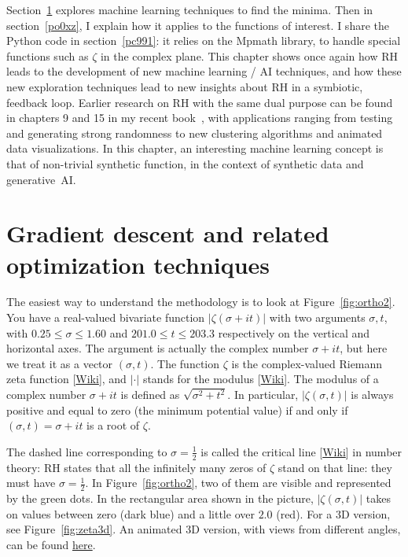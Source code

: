 \documentclass[oneside,10pt]{book}
\begin{document}
Section~\ref{hg21} explores machine learning techniques to find the minima. Then in section~\ref{po0xz}, I explain how it applies to the functions of interest. I share the Python code in section~\ref{pc991}: it relies on the Mpmath library, to handle special functions such as $\zeta$ in the complex plane. This chapter shows once again how RH leads to the development of new machine learning / AI techniques, and how these 
 new exploration techniques lead to new insights about RH in a symbiotic, feedback loop. Earlier research on RH with the same dual purpose can be found in chapters 9 and 15 in my recent book~\cite{vgelsevier}, with applications ranging from testing and generating strong randomness
 to new clustering algorithms and animated data visualizations. In this chapter, an interesting machine learning concept is that of non-trivial  synthetic function, in the context of synthetic data and generative~AI.  
 

\section{Gradient descent and related optimization techniques}\label{hg21}

The easiest way to understand the methodology is to look at Figure~\ref{fig:ortho2}. You have a real-valued bivariate function 
 $|\zeta(\sigma+it)|$ with two arguments $\sigma, t$, with $0.25\leq \sigma \leq 1.60$ and $201.0\leq t \leq 203.3$ respectively on the vertical and horizontal axes. The argument is actually the complex number $\sigma + it$, but here we treat it as a vector $(\sigma, t)$. 
 The function $\zeta$ is the complex-valued \textcolor{index}{Riemann zeta function} [\href{https://en.wikipedia.org/wiki/Riemann_zeta_function}{Wiki}], and $|\cdot|$ stands for the 
 \textcolor{index}{modulus} [\href{https://en.wikipedia.org/wiki/Absolute_value#Complex_numbers}{Wiki}]. 
The modulus of a complex number $\sigma + it$ is defined as $\sqrt{\sigma^2 + t^2}$.
In particular, 
$|\zeta(\sigma,t)|$ is always positive and equal to zero (the minimum potential value) if and only if $(\sigma, t) = \sigma + it$ is a root of $\zeta$.


The dashed line corresponding to $\sigma=\frac{1}{2}$ is called the \textcolor{index}{critical line} [\href{https://en.wikipedia.org/wiki/Riemann_hypothesis#Zeros_on_the_critical_line}{Wiki}] in number theory: RH states that all the infinitely many zeros of $\zeta$ stand on that line: they must have $\sigma=\frac{1}{2}$. In Figure~\ref{fig:ortho2}, two of them are visible and represented by the green dots. In the rectangular area shown in the picture, $|\zeta(\sigma,t)|$ takes on values between zero (dark blue) and a little over $2.0$ (red).  
 For a 3D version, see Figure~\ref{fig:zeta3d}. An animated 3D version, with views from different angles, can be found 
 \href{https://github.com/VincentGranville/Experimental-Math-Number-Theory/blob/main/Images/gradient_3D_rotate_zeta.mp4}{here}.
\end{document}
